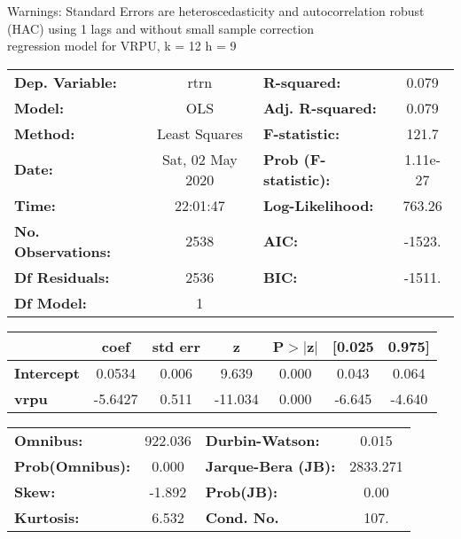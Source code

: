 Warnings: \newline
 [1] Standard Errors are heteroscedasticity and autocorrelation robust (HAC) using 1 lags and without small sample correction\\ 

regression model for VRPU, k = 12 h = 9\begin{center}
\begin{tabular}{lclc}
\toprule
\textbf{Dep. Variable:}    &       rtrn       & \textbf{  R-squared:         } &     0.079   \\
\textbf{Model:}            &       OLS        & \textbf{  Adj. R-squared:    } &     0.079   \\
\textbf{Method:}           &  Least Squares   & \textbf{  F-statistic:       } &     121.7   \\
\textbf{Date:}             & Sat, 02 May 2020 & \textbf{  Prob (F-statistic):} &  1.11e-27   \\
\textbf{Time:}             &     22:01:47     & \textbf{  Log-Likelihood:    } &    763.26   \\
\textbf{No. Observations:} &        2538      & \textbf{  AIC:               } &    -1523.   \\
\textbf{Df Residuals:}     &        2536      & \textbf{  BIC:               } &    -1511.   \\
\textbf{Df Model:}         &           1      & \textbf{                     } &             \\
\bottomrule
\end{tabular}
\begin{tabular}{lcccccc}
                   & \textbf{coef} & \textbf{std err} & \textbf{z} & \textbf{P$> |$z$|$} & \textbf{[0.025} & \textbf{0.975]}  \\
\midrule
\textbf{Intercept} &       0.0534  &        0.006     &     9.639  &         0.000        &        0.043    &        0.064     \\
\textbf{vrpu}      &      -5.6427  &        0.511     &   -11.034  &         0.000        &       -6.645    &       -4.640     \\
\bottomrule
\end{tabular}
\begin{tabular}{lclc}
\textbf{Omnibus:}       & 922.036 & \textbf{  Durbin-Watson:     } &    0.015  \\
\textbf{Prob(Omnibus):} &   0.000 & \textbf{  Jarque-Bera (JB):  } & 2833.271  \\
\textbf{Skew:}          &  -1.892 & \textbf{  Prob(JB):          } &     0.00  \\
\textbf{Kurtosis:}      &   6.532 & \textbf{  Cond. No.          } &     107.  \\
\bottomrule
\end{tabular}
\end{center}

